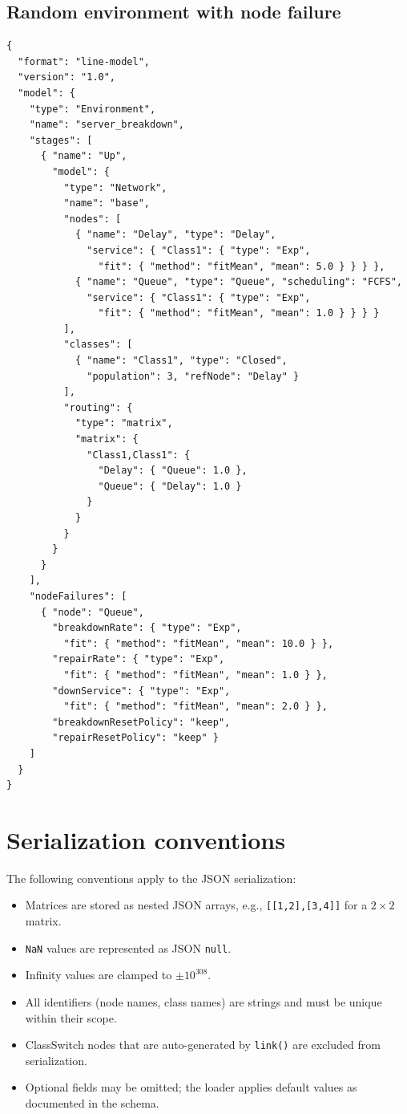 \subsection{Random environment with node failure}

\begin{lstlisting}[basicstyle=\ttfamily\scriptsize]
{
  "format": "line-model",
  "version": "1.0",
  "model": {
    "type": "Environment",
    "name": "server_breakdown",
    "stages": [
      { "name": "Up",
        "model": {
          "type": "Network",
          "name": "base",
          "nodes": [
            { "name": "Delay", "type": "Delay",
              "service": { "Class1": { "type": "Exp",
                "fit": { "method": "fitMean", "mean": 5.0 } } } },
            { "name": "Queue", "type": "Queue", "scheduling": "FCFS",
              "service": { "Class1": { "type": "Exp",
                "fit": { "method": "fitMean", "mean": 1.0 } } } }
          ],
          "classes": [
            { "name": "Class1", "type": "Closed",
              "population": 3, "refNode": "Delay" }
          ],
          "routing": {
            "type": "matrix",
            "matrix": {
              "Class1,Class1": {
                "Delay": { "Queue": 1.0 },
                "Queue": { "Delay": 1.0 }
              }
            }
          }
        }
      }
    ],
    "nodeFailures": [
      { "node": "Queue",
        "breakdownRate": { "type": "Exp",
          "fit": { "method": "fitMean", "mean": 10.0 } },
        "repairRate": { "type": "Exp",
          "fit": { "method": "fitMean", "mean": 1.0 } },
        "downService": { "type": "Exp",
          "fit": { "method": "fitMean", "mean": 2.0 } },
        "breakdownResetPolicy": "keep",
        "repairResetPolicy": "keep" }
    ]
  }
}
\end{lstlisting}

\section{Serialization conventions}
\label{json:conventions}

The following conventions apply to the JSON serialization:
\begin{itemize}
\item Matrices are stored as nested JSON arrays, e.g., \texttt{[[1,2],[3,4]]} for a $2\times 2$ matrix.
\item \texttt{NaN} values are represented as JSON \texttt{null}.
\item Infinity values are clamped to $\pm 10^{308}$.
\item All identifiers (node names, class names) are strings and must be unique within their scope.
\item ClassSwitch nodes that are auto-generated by \texttt{link()} are excluded from serialization.
\item Optional fields may be omitted; the loader applies default values as documented in the schema.
\end{itemize}

